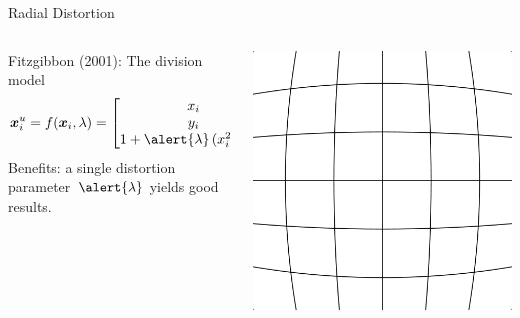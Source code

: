 \documentclass[aspectratio=169]{beamer}
\newcommand{\mat}[1]{\bm{#1}}
\begin{document}
\begin{frame}{Radial Distortion}
\begin{columns}
\begin{column}{0.6\textwidth}
        \begin{minipage}[t][\textheight][t]{\textwidth}
        \hiddenvariableTwoeHeight
        Fitzgibbon (2001): The division model
        \begin{equation*}
        \mat{x}_i^u = f(\mat{x}_i,\lambda)%
        = \begin{bmatrix}x_i\\y_i\\1+\alert{\lambda}\,(x_i^2+y_i^2)\end{bmatrix}\;.
        \end{equation*}
        Benefits: a single distortion parameter~$\alert{\lambda}$ yields good results.
        \end{minipage}
\end{column}%
\begin{column}{0.4\textwidth}
\includegraphics[width=0.9\linewidth]{images/distortion.png}
\end{column}%
\end{columns}%
\end{frame}
\end{document}
